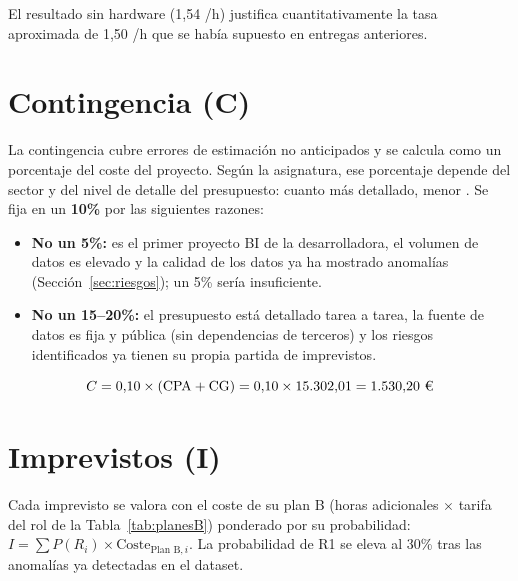 \documentclass[12pt, a4paper, oneside]{report}
\begin{document}
El resultado sin hardware (1,54 \texteuro{}/h) justifica cuantitativamente la tasa aproximada de 1,50 \texteuro{}/h que se había supuesto en entregas anteriores.

\section{Contingencia (C)}
La contingencia cubre errores de estimación no anticipados y se calcula como un porcentaje del coste del proyecto. Según la asignatura, ese porcentaje depende del sector y del nivel de detalle del presupuesto: cuanto más detallado, menor \cite{fib_costos}. Se fija en un \textbf{10\%} por las siguientes razones:
\begin{itemize}
    \item \textbf{No un 5\%:} es el primer proyecto BI de la desarrolladora, el volumen de datos es elevado y la calidad de los datos ya ha mostrado anomalías (Sección~\ref{sec:riesgos}); un 5\% sería insuficiente.
    \item \textbf{No un 15--20\%:} el presupuesto está detallado tarea a tarea, la fuente de datos es fija y pública (sin dependencias de terceros) y los riesgos identificados ya tienen su propia partida de imprevistos.
\end{itemize}
\begin{equation}
C = 0{,}10 \times (\text{CPA} + \text{CG}) = 0{,}10 \times 15.302{,}01 = 1.530{,}20\ \text{\texteuro{}}
\end{equation}

\section{Imprevistos (I)}
Cada imprevisto se valora con el coste de su plan B (horas adicionales $\times$ tarifa del rol de la Tabla~\ref{tab:planesB}) ponderado por su probabilidad: $I = \sum P(R_i) \times \text{Coste}_{\text{Plan B},i}$. La probabilidad de R1 se eleva al 30\% tras las anomalías ya detectadas en el dataset.
\end{document}
